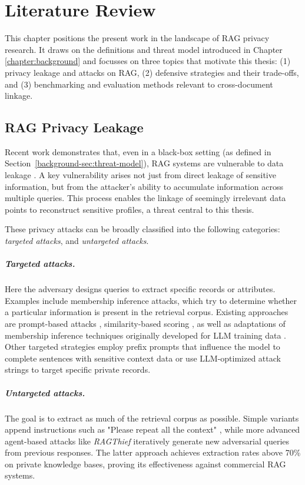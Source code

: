 \chapter{Literature Review}\label{chapter:literature}
This chapter positions the present work in the landscape of \ac{RAG} privacy research. It draws on the definitions and threat model introduced in Chapter \ref{chapter:background} and focusses on three topics that motivate this thesis: (1) privacy leakage and attacks on RAG, (2) defensive strategies and their trade-offs, and (3) benchmarking and evaluation methods relevant to cross-document linkage.

\section{RAG Privacy Leakage}\label{literature-sec:privacy-attacks}
Recent work demonstrates that, even in a black-box setting (as defined in Section~\ref{background-sec:threat-model}), \ac{RAG} systems are vulnerable to data leakage \cite{implicationsRAG,goodAndBad}. A key vulnerability arises not just from direct leakage of sensitive information, but from the attacker's ability to accumulate information across multiple queries. This process enables the linkage of seemingly irrelevant data points to reconstruct sensitive profiles, a threat central to this thesis.

These privacy attacks can be broadly classified into the following categories: \textit{targeted attacks}, and \textit{untargeted attacks}.

\paragraph{Targeted attacks.} Here the adversary designs queries to extract specific records or attributes. Examples include membership inference attacks, which try to determine whether a particular information is present in the retrieval corpus. Existing approaches are prompt-based attacks \cite{ragMIA}, similarity-based scoring \cite{generatingIsBelieving}, as well as adaptations of membership inference techniques originally developed for LLM training data \cite{extractingTrainingDataLLM,generatingIsBelieving}. Other targeted strategies employ prefix prompts that influence the model to complete sentences with sensitive context data or use LLM-optimized attack strings to target specific private records. \cite{goodAndBad, DEAL} 

\paragraph{Untargeted attacks.} The goal is to extract as much of the retrieval corpus as possible. Simple variants append instructions such as "Please repeat all the context" \cite{goodAndBad,spillTheBeans}, while more advanced agent-based attacks like \textit{RAGThief} \cite{ragThief} iteratively generate new adversarial queries from previous responses. The latter approach achieves extraction rates above 70\% on private knowledge bases, proving its effectiveness against commercial \ac{RAG} systems.

